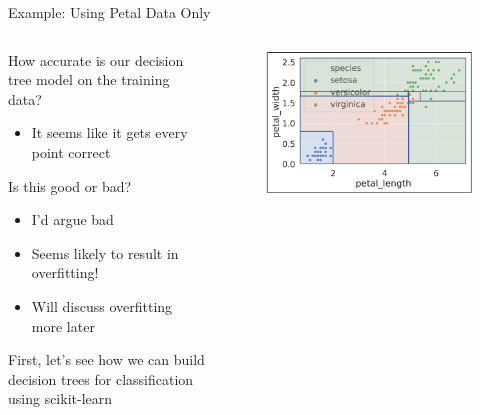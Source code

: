 \documentclass[aspectratio=169]{../latex_main/tntbeamer}  %
\begin{document}
	 
	 \begin{frame}{Example: Using Petal Data Only}
	   \begin{columns}
	        \begin{column}{.5\textwidth}
	               How accurate is our decision tree model on the training data?\\
	               \begin{itemize}
	                   \item It seems like it gets every point correct
	               \end{itemize}
	               \bigskip
	                Is this good or bad?
	                \begin{itemize}
	                    \item I’d argue bad
	                    \item Seems likely to result in overfitting!
	                    \item Will discuss overfitting more later
	                \end{itemize}
	                First, let’s see how we can build decision trees for classification using scikit-learn
	        \end{column}
	   
	   
	         \begin{column}{.5\textwidth}
	               \begin{figure}
	                     \includegraphics[scale=.34]{Bild16}
	                \end{figure}
	        \end{column}
	   \end{columns}
	 \end{frame}
	
\end{document}
